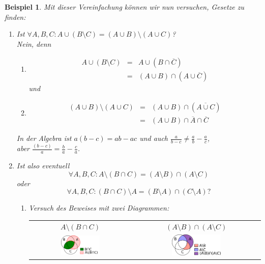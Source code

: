\documentclass{report}
\newtheorem{myexample}{Beispiel}
\begin{document}
\begin{myexample}Mit dieser Vereinfachung können wir nun versuchen, Gesetze zu finden:
\begin{enumerate}\item Ist $\forall A,B,C : A \cup (B \setminus C) = (A \cup B) \setminus (A \cup C)$?\\
Nein, denn
\begin{enumerate}\item \begin{eqnarray}A \cup (B \setminus C) & = & A \cup (B \cap \overline{C})\\ \nonumber
& = & (A \cup B) \cap (A \cup \overline{C})\end{eqnarray}
und
\item\begin{eqnarray}(A \cup B) \setminus (A \cup C) & = & (A \cup B) \cap (\overline{A \cup C}) \\ \nonumber
& = & (A \cup B) \cap \overline{A} \cap \overline{C}\end{eqnarray}
\end{enumerate}
In der Algebra ist $a(b-c) = ab-ac$ und auch $\frac{a}{b-c} \neq \frac{a}{b} - \frac{a}{c}$, 
\\
aber $\frac{(b-c)}{a} = \frac{b}{a} - \frac{c}{a}$.
\item Ist also eventuell
\begin{equation}\forall A,B,C : A \setminus (B \cap C) = (A \setminus B) \cap (A \setminus C)\end{equation}
oder
\begin{equation}\forall A,B,C : (B \cap C) \setminus A = (B \setminus A) \cap (C \setminus A)\mbox{?}\end{equation}
\begin{enumerate}\item Versuch des Beweises mit zwei Diagrammen:
\begin{center}\begin{tabular}{c c}
$A \setminus (B \cap C)$ & $(A \setminus B) \cap (A \setminus C)$ \\
\includegraphics[width=0.4\textwidth]{img/A_minus_BintersectC.pdf} & \includegraphics[width=0.4\textwidth]{img/AminusB_intersect_AminusC.pdf}

\end{tabular}
\end{center}
\end{enumerate}
\end{enumerate}
\end{myexample}
\end{document}
